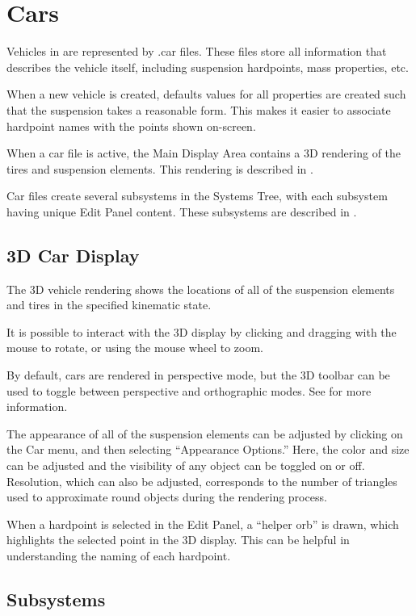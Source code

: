 \chapter{Cars} \label{ch:cars}

Vehicles in \vvase{} are represented by .car files.  These files store all information that describes the vehicle itself, including suspension hardpoints, mass properties, etc.

When a new vehicle is created, defaults values for all properties are created such that the suspension takes a reasonable form.  This makes it easier to associate hardpoint names with the points shown on-screen.

When a car file is active, the Main Display Area contains a 3D rendering of the tires and suspension elements.  This rendering is described in .

Car files create several subsystems in the Systems Tree, with each subsystem having unique Edit Panel content.  These subsystems are described in .

\section{3D Car Display} \label{sec:3dCarDisplay}

The 3D vehicle rendering shows the locations of all of the suspension elements and tires in the specified kinematic state.

It is possible to interact with the 3D display by clicking and dragging with the mouse to rotate, or using the mouse wheel to zoom.

By default, cars are rendered in perspective mode, but the 3D toolbar can be used to toggle between perspective and orthographic modes.  See  for more information.

The appearance of all of the suspension elements can be adjusted by clicking on the Car menu, and then selecting ``Appearance Options.''  Here, the color and size can be adjusted and the visibility of any object can be toggled on or off.  Resolution, which can also be adjusted, corresponds to the number of triangles used to approximate round objects during the rendering process.

When a hardpoint is selected in the Edit Panel, a ``helper orb'' is drawn, which highlights the selected point in the 3D display.  This can be helpful in understanding the naming of each hardpoint.

\section{Subsystems} \label{sec:subsystems}

